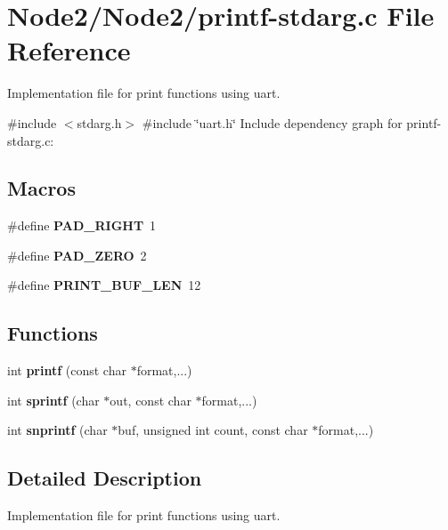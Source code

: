\hypertarget{printf-stdarg_8c}{}\section{Node2/\+Node2/printf-\/stdarg.c File Reference}
\label{printf-stdarg_8c}


Implementation file for print functions using uart.  


{\ttfamily \#include $<$stdarg.\+h$>$}\newline
{\ttfamily \#include \char`\"{}uart.\+h\char`\"{}}\newline
Include dependency graph for printf-\/stdarg.c\+:
\subsection*{Macros}
\begin{DoxyCompactItemize}
\item 
\mbox{\label{printf-stdarg_8c_a6fd5dddc97219412ab1c4483ce144aef}} 
\#define {\bfseries P\+A\+D\+\_\+\+R\+I\+G\+HT}~1
\item 
\mbox{\label{printf-stdarg_8c_a0b08e2c1689b9348d321cdc8846950af}} 
\#define {\bfseries P\+A\+D\+\_\+\+Z\+E\+RO}~2
\item 
\mbox{\label{printf-stdarg_8c_a5bf270eda1fe4ed63535e31fab16433e}} 
\#define {\bfseries P\+R\+I\+N\+T\+\_\+\+B\+U\+F\+\_\+\+L\+EN}~12
\end{DoxyCompactItemize}
\subsection*{Functions}
\begin{DoxyCompactItemize}
\item 
\mbox{\label{printf-stdarg_8c_a98631211a4a8aee62f572375d5b637be}} 
int {\bfseries printf} (const char $\ast$format,...)
\item 
\mbox{\label{printf-stdarg_8c_aa0649118bc3728b2a62af0b47606ff51}} 
int {\bfseries sprintf} (char $\ast$out, const char $\ast$format,...)
\item 
\mbox{\label{printf-stdarg_8c_a0b3526078beb75778277d06a066c9508}} 
int {\bfseries snprintf} (char $\ast$buf, unsigned int count, const char $\ast$format,...)
\end{DoxyCompactItemize}


\subsection{Detailed Description}
Implementation file for print functions using uart. 

